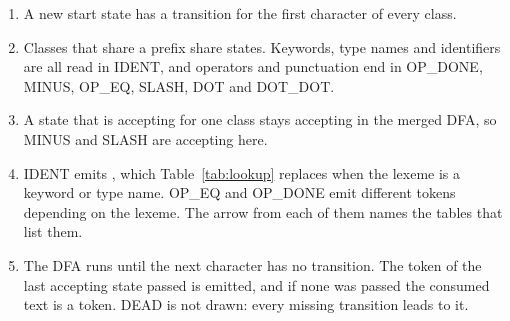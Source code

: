 \begin{enumerate}
    \item A new start state has a transition for the first character of
    every class.
    \item Classes that share a prefix share states. Keywords, type names
    and identifiers are all read in IDENT, and operators and punctuation
    end in OP\_DONE, MINUS, OP\_EQ, SLASH, DOT and DOT\_DOT.
    \item A state that is accepting for one class stays accepting in the
    merged DFA, so MINUS and SLASH are accepting here.
    \item IDENT emits , which
    Table~\ref{tab:lookup} replaces when the lexeme is a keyword or type
    name. OP\_EQ and OP\_DONE emit different tokens depending on the
    lexeme. The arrow from each of them names the tables that list them.
    \item The DFA runs until the next character has no transition. The
    token of the last accepting state passed is emitted, and if none was
    passed the consumed text is a 
    token. DEAD is not drawn: every missing transition leads to it.
\end{enumerate}

